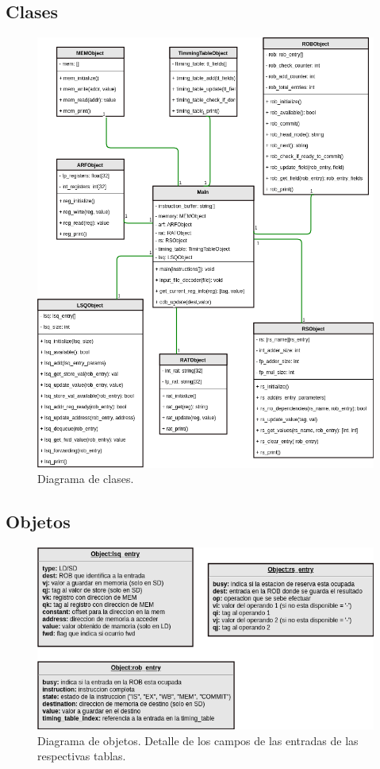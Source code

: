 \documentclass[a4paper]{article}
\begin{document}
	\subsection*{Clases}
	
	\begin{figure}[H]
		\centering
		\includegraphics[width=1\textwidth]{figures/clases.png}
		\caption{\label{fig:clases}Diagrama de clases.}
	\end{figure}

	\subsection*{Objetos}

	\begin{figure}[H]		
		\centering
		\includegraphics[width=.7\textwidth]{figures/objetos.png}
		\caption{\label{fig:objetos}Diagrama de objetos. Detalle de los campos de las entradas de las respectivas tablas.}
	\end{figure}
\end{document}
